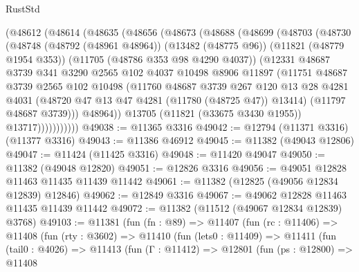 \begin{lexlean}{RustStd}
\begin{coremodule}
        (@48612
          (@48614
            (@48635
              (@48656
                (@48673
                  (@48688
                    (@48699
                      (@48703
                        (@48730
                          (@48748
                            (@48792 (@48961 @48964))
                            (@13482 (@48775 @96))
                            (@11821 (@48779 @1954 @353))
                            (@11705 (@48786 @353 @98 @4290 @4037))
                            (@12331
                              @48687
                              @3739
                              @341
                              @3290
                              @2565
                              @102
                              @4037
                              @10498
                              @8906
                              @11897
                              (@11751
                                @48687
                                @3739
                                @2565
                                @102
                                @10498
                                (@11760
                                  @48687
                                  @3739
                                  @267
                                  @120
                                  @13
                                  @28
                                  @4281
                                  @4031
                                  (@48720 @47 @13 @47 @4281 (@11780 (@48725 @47)) @13414)
                                  (@11797 @48687 @3739)))
                              @48964))
                          @13705
                          (@11821 (@33675 @3430 @1955))
                          @13717)))))))))))
@49038 := @11365 @3316
@49042 := @12794 (@11371 @3316) (@11377 @3316)
@49043 := @11386 @46912
@49045 := @11382 (@49043 @12806)
@49047 := @11424 (@11425 @3316)
@49048 := @11420 @49047
@49050 := @11382 (@49048 @12820)
@49051 := @12826 @3316
@49056 := @49051 @12828 @11463 @11435 @11439 @11442
@49061 := @11382 (@12825 (@49056 @12834 @12839) @12846)
@49062 := @12849 @3316
@49067 := @49062 @12828 @11463 @11435 @11439 @11442
@49072 := @11382 (@11512 (@49067 @12834 @12839) @3768)
@49103 := @11381
    (fun (fn : @89) =>
    @11407
      (fun (rc : @11406) =>
      @11408
        (fun (rty : @3602) =>
        @11410
          (fun (lets0 : @11409) =>
          @11411
            (fun (tail0 : @4026) =>
            @11413
              (fun (Γ : @11412) =>
              @12801
                (fun (ps : @12800) =>
                @11408

\end{coremodule}
\end{lexlean}
